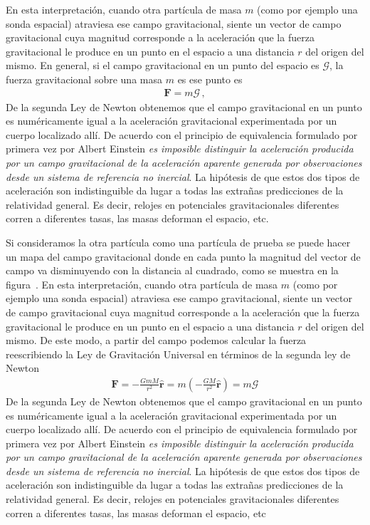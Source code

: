 En esta interpretación, cuando otra partícula de masa $m$ (como por ejemplo una sonda espacial) atraviesa ese campo gravitacional, siente un vector de campo gravitacional cuya magnitud corresponde a la aceleración que la fuerza gravitacional le produce en un punto en el espacio a una distancia $r$ del origen del mismo. En general, si el campo gravitacional en un punto del espacio es $\boldsymbol{\mathcal{G}}$, la fuerza gravitacional sobre una masa $m$ es ese punto es
\begin{align}
  \mathbf{F}=m\boldsymbol{\mathcal{G}}\,,
\end{align}
De la segunda Ley de Newton obtenemos que el campo gravitacional en un punto es numéricamente igual a la aceleración gravitacional experimentada por un cuerpo localizado allí. De acuerdo con el principio de equivalencia formulado por primera vez por Albert Einstein \emph{es imposible distinguir la aceleración producida por un campo gravitacional de la aceleración aparente generada por observaciones desde un sistema de referencia no inercial}. La hipótesis de que estos dos tipos de aceleración son indistinguible da lugar a todas las extrañas predicciones de la relatividad general. Es decir, relojes en potenciales gravitacionales diferentes corren a diferentes tasas, las masas deforman el espacio, etc.




Si consideramos la otra partícula como una partícula de prueba se puede hacer un mapa del campo gravitacional donde en cada punto la magnitud del vector de campo va disminuyendo con la distancia al cuadrado, como se muestra en la figura~\cite{fig:graviatationalfield}. En esta interpretación, cuando otra partícula de masa $m$ (como por ejemplo una sonda espacial) atraviesa ese campo gravitacional, siente un vector de campo gravitacional cuya magnitud corresponde a la aceleración que la fuerza gravitacional le produce en un punto en el espacio a una distancia $r$ del origen del mismo.  De este modo, a partir del campo podemos calcular la fuerza reescribiendo la Ley de Gravitación Universal en términos de la segunda ley de Newton
\begin{align}
  \label{eq:gug}
  \mathbf{F}=-\frac{GmM}{r^2}\hat{\mathbf{r}}=m
  \left(-\frac{GM}{r^2}\hat{\mathbf{r}}  \right)=m\boldsymbol{\mathcal{G}}
\end{align}
De la segunda Ley de Newton obtenemos que el campo gravitacional en un punto es numéricamente igual a la aceleración gravitacional experimentada por un cuerpo localizado allí. De acuerdo con el principio de equivalencia formulado por primera vez por Albert Einstein \emph{es imposible distinguir la aceleración producida por un campo gravitacional de la aceleración aparente generada por observaciones desde un sistema de referencia no inercial}. La hipótesis de que estos dos tipos de aceleración son indistinguible da lugar a todas las extrañas predicciones de la relatividad general. Es decir, relojes en potenciales gravitacionales diferentes corren a diferentes tasas, las masas deforman el espacio, etc

